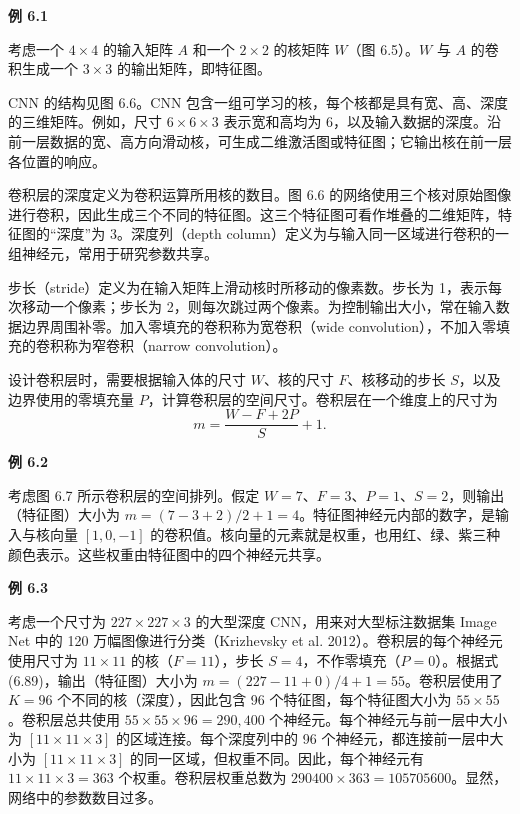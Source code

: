 \noindent\textbf{例 6.1}

考虑一个 $4\times4$ 的输入矩阵 $A$ 和一个 $2\times2$ 的核矩阵 $W$（图 6.5）。$W$ 与 $A$ 的卷积生成一个 $3\times3$ 的输出矩阵，即特征图。


CNN 的结构见图 6.6。CNN 包含一组可学习的核，每个核都是具有宽、高、深度的三维矩阵。例如，尺寸 $6\times6\times3$ 表示宽和高均为 6，以及输入数据的深度。沿前一层数据的宽、高方向滑动核，可生成二维激活图或特征图；它输出核在前一层各位置的响应。


卷积层的深度定义为卷积运算所用核的数目。图 6.6 的网络使用三个核对原始图像进行卷积，因此生成三个不同的特征图。这三个特征图可看作堆叠的二维矩阵，特征图的“深度”为 3。深度列（depth column）定义为与输入同一区域进行卷积的一组神经元，常用于研究参数共享。

步长（stride）定义为在输入矩阵上滑动核时所移动的像素数。步长为 1，表示每次移动一个像素；步长为 2，则每次跳过两个像素。为控制输出大小，常在输入数据边界周围补零。加入零填充的卷积称为宽卷积（wide convolution），不加入零填充的卷积称为窄卷积（narrow convolution）。

设计卷积层时，需要根据输入体的尺寸 $W$、核的尺寸 $F$、核移动的步长 $S$，以及边界使用的零填充量 $P$，计算卷积层的空间尺寸。卷积层在一个维度上的尺寸为
\begin{equation}
m=\frac{W-F+2P}{S}+1.
\tag{6.90}
\end{equation}

\noindent\textbf{例 6.2}

考虑图 6.7 所示卷积层的空间排列。假定 $W=7$、$F=3$、$P=1$、$S=2$，则输出（特征图）大小为 $m=(7-3+2)/2+1=4$。特征图神经元内部的数字，是输入与核向量 $[1,0,-1]$ 的卷积值。核向量的元素就是权重，也用红、绿、紫三种颜色表示。这些权重由特征图中的四个神经元共享。


\noindent\textbf{例 6.3}

考虑一个尺寸为 $227\times227\times3$ 的大型深度 CNN，用来对大型标注数据集 Image Net 中的 120 万幅图像进行分类（Krizhevsky et al. 2012）。卷积层的每个神经元使用尺寸为 $11\times11$ 的核（$F=11$），步长 $S=4$，不作零填充（$P=0$）。根据式 (6.89)，输出（特征图）大小为 $m=(227-11+0)/4+1=55$。卷积层使用了 $K=96$ 个不同的核（深度），因此包含 96 个特征图，每个特征图大小为 $55\times55$。卷积层总共使用 $55\times55\times96=290,400$ 个神经元。每个神经元与前一层中大小为 $[11\times11\times3]$ 的区域连接。每个深度列中的 96 个神经元，都连接前一层中大小为 $[11\times11\times3]$ 的同一区域，但权重不同。因此，每个神经元有 $11\times11\times3=363$ 个权重。卷积层权重总数为 $290400\times363=105705600$。显然，网络中的参数数目过多。

